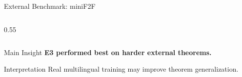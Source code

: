 \documentclass[aspectratio=169]{beamer}
\begin{document}
\begin{frame}{External Benchmark: miniF2F}
\begin{columns}[c]
\begin{column}{0.55\textwidth}
\end{column}

\end{columns}

\vspace{0.5cm}

\begin{alertblock}{Main Insight}
\centering
\large \textbf{E3 performed best on harder external theorems.}
\end{alertblock}

\vspace{0.15cm}

\begin{block}{Interpretation}
\centering
Real multilingual training may improve theorem generalization.
\end{block}

\end{frame}
\end{document}
